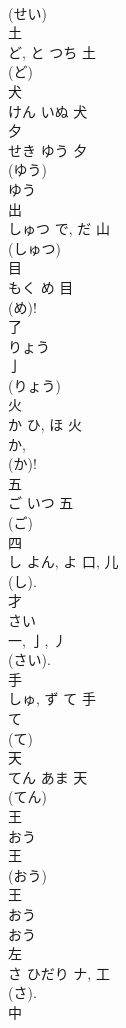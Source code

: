 \documentclass[8pt]{extreport}
\begin{document}
\begin{CJK}{UTF8}{min}
\\	(せい) 
\\	土	
\\	ど, と	つち	土	
\\	(ど) 
\\	犬	
\\	けん	いぬ	犬	
\\	夕	
\\	せき	ゆう	夕	
\\	(ゆう) 
\\	ゆう 
\\	出	
\\	しゅつ	で, だ	山	
\\	(しゅつ) 
\\	目	
\\	もく	め	目	
\\	(め)!
\\	了	
\\	りょう	
\\	亅	
\\	(りょう) 
\\	火	
\\	か	ひ, ほ	火	
\\	か, 
\\	(か)! 
\\	五	
\\	ご	いつ	五	
\\	(ご) 
\\	四	
\\	し	よん, よ	口, 儿	
\\	(し). 
\\	才	
\\	さい	
\\	一, 亅, 丿	
\\	(さい).	
\\	手	
\\	しゅ, ず	て	手	
\\	て 
\\	(て) 
\\	天	
\\	てん	あま	天	
\\	(てん) 
\\	王	
\\	おう	
\\	王	
\\	(おう) 
\\	王 
\\	おう 
\\	おう 
\\	左	
\\	さ	ひだり	ナ, 工	
\\	(さ). 
\\	中	

\end{CJK}
\end{document}
